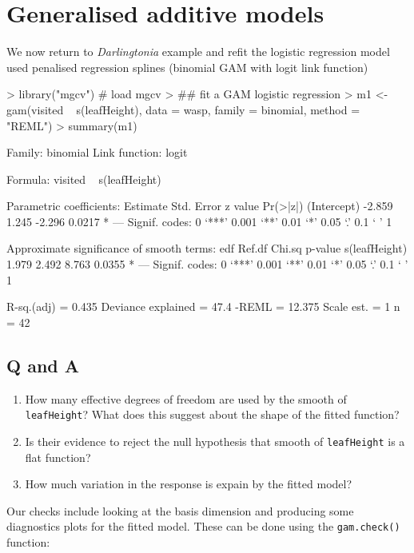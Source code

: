 \documentclass[a4paper,10pt]{article}
\begin{document}
\section{Generalised additive models}

We now return to \textit{Darlingtonia} example and refit the logistic regression model used penalised regression splines (binomial GAM with logit link function)

\begin{Schunk}
\begin{Sinput}
> library("mgcv")                       # load mgcv
> ## fit a GAM logistic regression
> m1 <- gam(visited ~ s(leafHeight), data = wasp, family = binomial, method = "REML")
> summary(m1)
\end{Sinput}
\begin{Soutput}
Family: binomial 
Link function: logit 

Formula:
visited ~ s(leafHeight)

Parametric coefficients:
            Estimate Std. Error z value Pr(>|z|)  
(Intercept)   -2.859      1.245  -2.296   0.0217 *
---
Signif. codes:  0 ‘***’ 0.001 ‘**’ 0.01 ‘*’ 0.05 ‘.’ 0.1 ‘ ’ 1

Approximate significance of smooth terms:
                edf Ref.df Chi.sq p-value  
s(leafHeight) 1.979  2.492  8.763  0.0355 *
---
Signif. codes:  0 ‘***’ 0.001 ‘**’ 0.01 ‘*’ 0.05 ‘.’ 0.1 ‘ ’ 1

R-sq.(adj) =  0.435   Deviance explained = 47.4%
-REML = 12.375  Scale est. = 1         n = 42
\end{Soutput}
\end{Schunk}

\subsection*{Q and A}
\begin{enumerate}
\item How many effective degrees of freedom are used by the smooth of \texttt{leafHeight}? What does this suggest about the shape of the fitted function?
\item Is their evidence to reject the null hypothesis that smooth of \texttt{leafHeight} is a flat function?
\item How much variation in the response is expain by the fitted model?
\end{enumerate}

Our checks include looking at the basis dimension and producing some diagnostics plots for the fitted model. These can be done using the \texttt{gam.check()} function:
\end{document}
